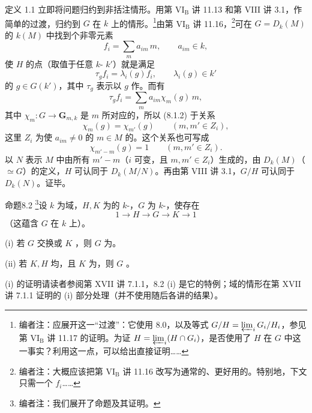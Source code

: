 定义 1.1 立即将问题归约到非括注情形。用第 VI$_{\mathrm B}$ 讲 11.13 和第 VIII 讲 3.1，作简单的过渡，归约到 $G$ 在 $k$ 上的情形。\footnote{编者注：应展开这一“过渡”：它使用 8.0，以及等式 $G/H=\varprojlim_iG_i/H_i$，参见第 VI$_{\mathrm B}$ 讲 11.17 的证明。为证 $H=\varprojlim_i(H\cap G_i)$，是否使用了 $H$ 在 $G$ 中这一事实？利用这一点，可以给出直接证明……}由第 VI$_{\mathrm B}$ 讲 11.16，\footnote{编者注：大概应该把第 VI$_{\mathrm B}$ 讲 11.16 改写为通常的、更好用的。特别地，下文只需一个 $f_i$……}可在 $G=D_k(M)$ 的 $k(M)$ 中找到个非零元素
\[f_i=\sum_m a_{im}\,m,\qquad a_{im}\in k,\tag{8.1.1}\]
使 $H$ 的点（取值于任意 $k$- $k'$）就是满足
\[\tau_gf_i=\lambda_i(g)f_i,\qquad\lambda_i(g)\in k'\tag{8.1.2}\]
的 $g\in G(k')$，其中 $\tau_g$ 表示以 $g$ 作。而有
\[\tau_gf_i=\sum_m a_{im}\chi_m(g)\,m,\tag{8.1.3}\]
其中 $\chi_m:G\to\mathbf G_{m,k}$ 是 $m$ 所对应的，所以 (8.1.2) 于关系
\[\chi_m(g)=\chi_{m'}(g)\qquad(m,m'\in Z_i),\tag{8.1.4}\]
这里 $Z_i$ 为使 $a_{im}\ne0$ 的 $m\in M$ 的。这个关系也可写成
\[\chi_{m'-m}(g)=1\qquad(m,m'\in Z_i).\]
以 $N$ 表示 $M$ 中由所有 $m'-m$（$i$ 可变，且 $m,m'\in Z_i$）生成的，由 $D_k(M)$（$\simeq G$）的定义，$H$ 可认同于 $D_k(M/N)$。再由第 VIII 讲 3.1，$G/H$ 可认同于 $D_k(N)$。证毕。
\begin{SGAresult}{命题}{8.2}
\footnote{编者注：我们展开了命题及其证明。}设 $k$ 为域，$H,K$ 为的 $k$-，$G$ 为 $k$-，使存在
\[1\longrightarrow H\longrightarrow G\longrightarrow K\longrightarrow1\]
（这蕴含 $G$ 在 $k$ 上）。

 (i) 若 $G$ 交换或 $K$ ，则 $G$ 为。

 (ii) 若 $K,H$ 均，且 $K$ 为，则 $G$ 。
\end{SGAresult}
(i) 的证明请读者参阅第 XVII 讲 7.1.1，8.2 (i) 是它的特例；域的情形在第 XVII 讲 7.1.1 证明的 (i) 部分处理（并不使用随后各讲的结果）。


